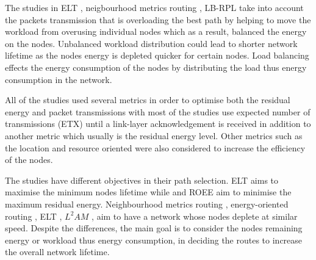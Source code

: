 The studies in ELT \cite{elt}, neigbourhood metrics routing \cite{spreadload}, LB-RPL \cite{loadbalance} take into account the packets transmission that is overloading the best path by helping to move the workload from overusing individual nodes which as a result, balanced the energy on the nodes. Unbalanced workload distribution could lead to shorter network lifetime as the nodes energy is depleted quicker for certain nodes. Load balancing effects the energy consumption of the nodes by distributing the load thus energy consumption in the network.

All of the studies used several metrics in order to optimise both the residual energy and packet transmissions with most of the studies use expected number of transmissions (ETX) until a link-layer acknowledgement is received in addition to another metric which usually is the residual energy level. Other metrics such as the location and resource oriented were also considered to increase the efficiency of the nodes.

The studies have different objectives in their path selection.
ELT \cite{elt} aims to maximise the minimum nodes lifetime while \cite{energyrpl} and ROEE \cite{roee} aim to minimise the maximum residual energy. Neighbourhood metrics routing \cite{spreadload}, energy-oriented routing \cite{loadbalance}, ELT \cite{elt}, $L^{2}AM$ \cite{compositeMetric}, \cite{customOF} aim to have a network whose nodes deplete at similar speed. 
Despite the differences, the main goal is to consider the nodes remaining energy or workload thus energy consumption, in deciding the routes to increase the overall network lifetime. 



